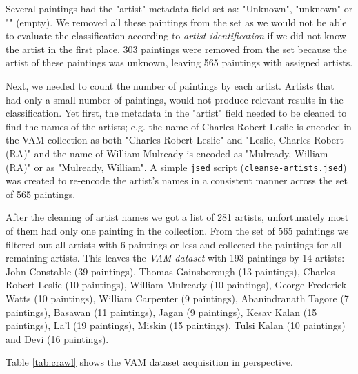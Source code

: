 \documentclass[11pt,a4paper,twoside,openright]{report}
\begin{document}
Several paintings had the "artist" metadata field set as: "Unknown", "unknown"
or "" (empty).  We removed all these paintings from the set as we would not be
able to evaluate the classification according to \emph{artist identification}
if we did not know the artist in the first place.  303 paintings were removed
from the set because the artist of these paintings was unknown, leaving 565
paintings with assigned artists.

Next, we needed to count the number of paintings by each artist.  Artists that
had only a small number of paintings, would not produce relevant results in the
classification.  Yet first, the metadata in the "artist" field needed to be
cleaned to find the names of the artists; e.g. the name of Charles Robert
Leslie is encoded in the VAM collection as both "Charles Robert Leslie" and
"Leslie, Charles Robert (RA)" and the name of William Mulready is encoded as
"Mulready, William (RA)" or as "Mulready, William".  A simple \texttt{jsed}
script (\texttt{cleanse-artists.jsed}) was created to re-encode the artist's
names in a consistent manner across the set of 565 paintings.

After the cleaning of artist names we got a list of 281 artists, unfortunately
most of them had only one painting in the collection.  From the set of 565
paintings we filtered out all artists with 6 paintings or less and collected
the paintings for all remaining artists.  This leaves the \emph{VAM dataset}
with 193 paintings by 14 artists: John Constable (39 paintings), Thomas
Gainsborough (13 paintings), Charles Robert Leslie (10 paintings), William
Mulready (10 paintings), George Frederick Watts (10 paintings), William
Carpenter (9 paintings), Abanindranath Tagore (7 paintings), Basawan (11
paintings), Jagan (9 paintings), Kesav Kalan (15 paintings), La'l (19
paintings), Miskin (15 paintings), Tulsi Kalan (10 paintings) and Devi (16
paintings).

Table \ref{tab:crawl} shows the VAM dataset acquisition in perspective.
\end{document}
